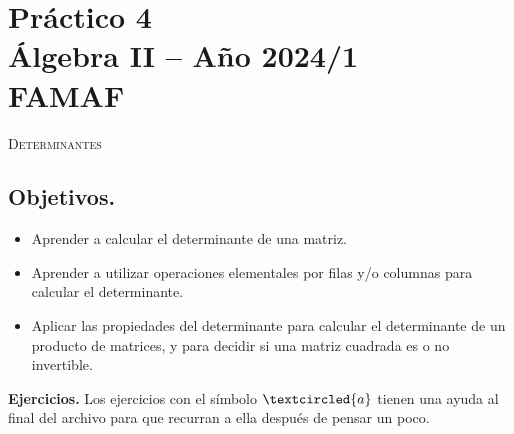 \section*{ Práctico 4 \\ Álgebra  II -- Año 2024/1 \\ FAMAF}\label{practico-4}
    

\centerline{\textsc{Determinantes}}


\subsection*{Objetivos.}

\begin{itemize}
\item Aprender a calcular el determinante de una matriz.

\item Aprender a utilizar operaciones elementales por filas y/o columnas para calcular el determinante.

\item Aplicar las propiedades del determinante para calcular el determinante de un producto de matrices, y para decidir si una matriz cuadrada es o no invertible.
\end{itemize}
		

\noindent \textbf{Ejercicios.} Los ejercicios con el símbolo $\textcircled{a}$ tienen una ayuda al final del archivo para que recurran a ella después de pensar un poco.

